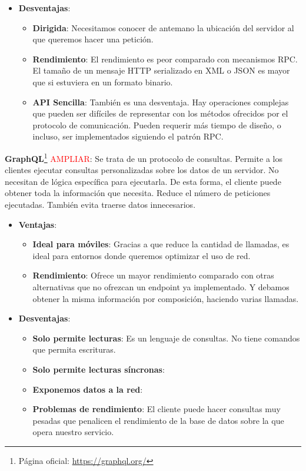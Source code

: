 \begin{itemize}
  \item \textbf{Desventajas}:

  \begin{itemize}
    \item \textbf{Dirigida}: Necesitamos conocer de antemano la ubicación del servidor al que queremos hacer una petición.

    \item \textbf{Rendimiento}: El rendimiento es peor comparado con mecanismos RPC. El tamaño de un mensaje HTTP serializado en XML o JSON es mayor que si estuviera en un formato binario.

    \item \textbf{API Sencilla}: También es una desventaja. Hay operaciones complejas que pueden ser difíciles de representar con los métodos ofrecidos por el protocolo de comunicación. Pueden requerir más tiempo de diseño, o incluso, ser implementados siguiendo el patrón RPC.
  \end{itemize}
\end{itemize}

\textbf{GraphQL}\footnote{Página oficial: \url{https://graphql.org/}} \textcolor{red}{AMPLIAR}: Se trata de un protocolo de consultas. Permite a los clientes ejecutar consultas personalizadas sobre los datos de un servidor. No necesitan de lógica específica para ejecutarla. De esta forma, el cliente puede obtener toda la información que necesita. Reduce el número de peticiones ejecutadas. También evita traerse datos innecesarios.

\begin{itemize}
  \item \textbf{Ventajas}:

  \begin{itemize}
    \item \textbf{Ideal para móviles}: Gracias a que reduce la cantidad de llamadas, es ideal para entornos donde queremos optimizar el uso de red.

    \item \textbf{Rendimiento}: Ofrece un mayor rendimiento comparado con otras alternativas que no ofrezcan un endpoint ya implementado. Y debamos obtener la misma información por composición, haciendo varias llamadas.
  \end{itemize}

  \item \textbf{Desventajas}:

  \begin{itemize}
    \item \textbf{Solo permite lecturas}: Es un lenguaje de consultas. No tiene comandos que permita escrituras.

    \item \textbf{Solo permite lecturas síncronas}:

    \item \textbf{Exponemos datos a la red}:

    \item \textbf{Problemas de rendimiento}: El cliente puede hacer consultas muy pesadas que penalicen el rendimiento de la base de datos sobre la que opera nuestro servicio.
  \end{itemize}
\end{itemize}

